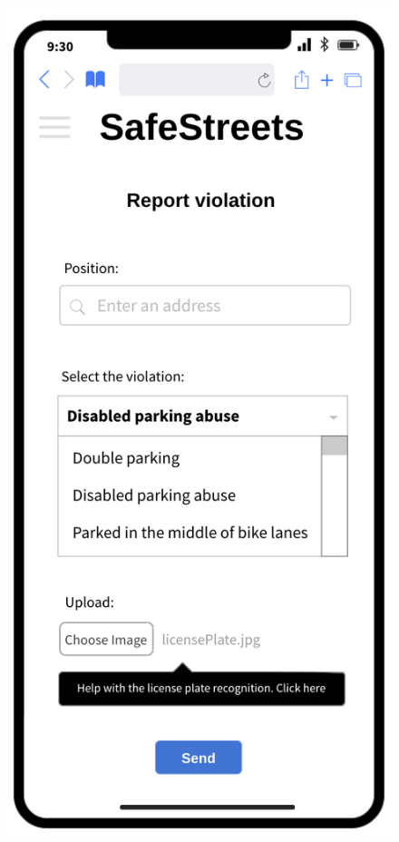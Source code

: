 \newpage

\begin{figure}[H]
	\centering
	\begin{minipage}[b]{0.40\textwidth}
		\includegraphics[width=\textwidth]{Images/dd-mocks/report.png}

\end{minipage}
\end{figure}
